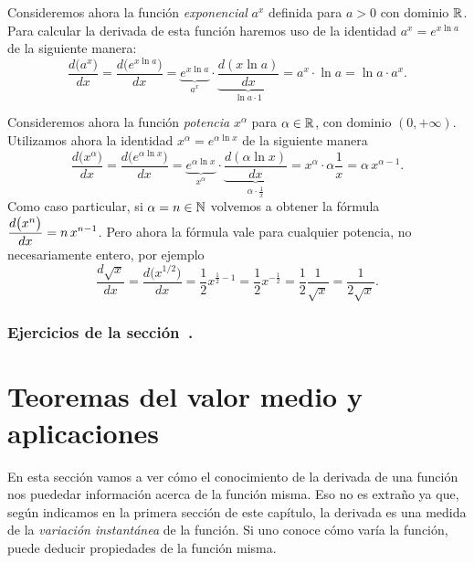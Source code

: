 \begin{example}
    Consideremos ahora la función \emph{exponencial} $a^x$ definida para $a>0$ con dominio $\mathbb{R}$. Para calcular la derivada de esta función haremos uso de la identidad $a^x=e^{x \ln a}$ de la siguiente manera:
    \[
    \frac{d \big(a^x\big)}{dx} = \frac{d \big(e^{x \ln a}\big)}{dx}
    = \underbrace{e^{x \ln a}}_{a^x} \cdot \underbrace{\frac{d (x\ln a)}{dx}}_{\ln a \cdot 1}
    = a^x \cdot \ln a
    = \ln a \cdot a^x.
    \]
\end{example}

\begin{example}
    Consideremos ahora la función \emph{potencia} $x^\alpha$ para $\alpha\in\mathbb{R}$, con dominio $(0,+\infty)$. Utilizamos ahora la identidad $x^\alpha=e^{\alpha \ln x}$ de la siguiente manera
    \[
    \frac{d \big(x^\alpha\big)}{dx} = \frac{d \big(e^{\alpha \ln x}\big)}{dx}
    = \underbrace{e^{\alpha \ln x}}_{x^\alpha} \cdot \underbrace{\frac{d (\alpha \ln x)}{dx}}_{\alpha \cdot \frac1x}
    = x^\alpha \cdot \alpha \frac 1x
    = \alpha \, x^{\alpha-1}.
    \]
    Como caso particular, si $\alpha=n\in\mathbb{N}$ volvemos a obtener la fórmula $\displaystyle \frac{d \big(x^n\big)}{dx}=n \, x^{n-1}$. Pero ahora la fórmula vale para cualquier potencia, no necesariamente entero, por ejemplo
    \[
    \frac{d \sqrt{x}}{dx} 
    =
    \frac{d \big(x^{1/2}\big)}{dx}
    = \frac12 x^{\frac12-1} 
    = \frac12 x^{-\frac12}
    = \frac12\frac1{\sqrt{x}}
    = \frac1{2\sqrt{x}}.
    \]
\end{example}


\subsubsection*{Ejercicios de la sección~.}

\begin{enumerate}

\end{enumerate}



\section{Teoremas del valor medio y aplicaciones}

En esta sección vamos a ver cómo el conocimiento de la derivada de una función nos puededar información acerca de la función misma. 
Eso no es extraño ya que, según indicamos en la primera sección de este capítulo, la derivada es una medida de la \emph{variación instantánea} de la función. Si uno conoce cómo varía la función, puede deducir propiedades de la función misma.


